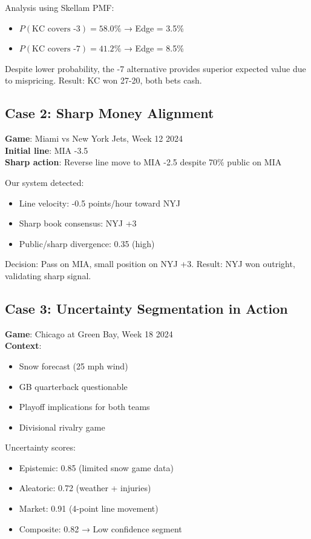 Analysis using Skellam PMF:
\begin{itemize}
  \item $P(\text{KC covers -3}) = 58.0\%$ → Edge = 3.5\%
  \item $P(\text{KC covers -7}) = 41.2\%$ → Edge = 8.5\%
\end{itemize}

Despite lower probability, the -7 alternative provides superior expected value due to mispricing. Result: KC won 27-20, both bets cash.

\subsection{Case 2: Sharp Money Alignment}

\textbf{Game}: Miami vs New York Jets, Week 12 2024\\
\textbf{Initial line}: MIA -3.5\\
\textbf{Sharp action}: Reverse line move to MIA -2.5 despite 70\% public on MIA

Our system detected:
\begin{itemize}
  \item Line velocity: -0.5 points/hour toward NYJ
  \item Sharp book consensus: NYJ +3
  \item Public/sharp divergence: 0.35 (high)
\end{itemize}

Decision: Pass on MIA, small position on NYJ +3. Result: NYJ won outright, validating sharp signal.

\subsection{Case 3: Uncertainty Segmentation in Action}

\textbf{Game}: Chicago at Green Bay, Week 18 2024\\
\textbf{Context}:
\begin{itemize}
  \item Snow forecast (25 mph wind)
  \item GB quarterback questionable
  \item Playoff implications for both teams
  \item Divisional rivalry game
\end{itemize}

Uncertainty scores:
\begin{itemize}
  \item Epistemic: 0.85 (limited snow game data)
  \item Aleatoric: 0.72 (weather + injuries)
  \item Market: 0.91 (4-point line movement)
  \item Composite: 0.82 → Low confidence segment
\end{itemize}

